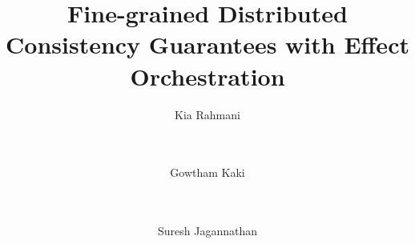 \documentclass[authorversion]{sig-alternate-05-2015}
\begin{document}




\title{Fine-grained Distributed Consistency Guarantees with Effect
Orchestration}
%
%
%
%
%

%
\author{
%
%
\alignauthor
Kia Rahmani \\ 
       \\
       \\
\and \alignauthor
Gowtham Kaki\\ 
       \\
       \\
\and \alignauthor Suresh Jagannathan\\
       \\
       \\
}
\end{document}
